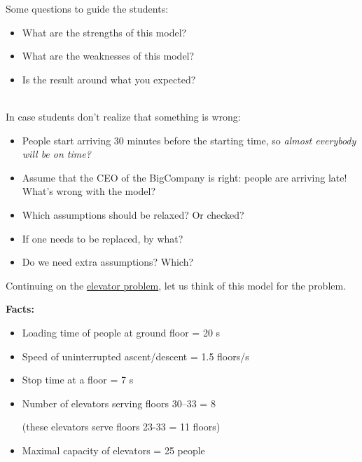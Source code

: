 
\begin{annotation}
\begin{notes}
	Some questions to guide the students:
	\begin{itemize}
		\item What are the strengths of this model?
		\item What are the weaknesses of this model?
		\item Is the result around what you expected?
	\end{itemize}	
	
	\hfill \\
	In case students don't realize that something is wrong:
	\begin{itemize}
		\item People start arriving 30 minutes before the starting time, so \emph{almost everybody will be on time?}
		\item Assume that the CEO of the BigCompany is right: people are arriving late! What's wrong with the model?
	
		\item Which assumptions should be relaxed? Or checked?
		\item If one needs to be replaced, by what?
		\item Do we need extra assumptions? Which?
	\end{itemize}
\end{notes}
\end{annotation}
\question

Continuing on the \hyperref[elevator-model]{elevator problem}, let us think of this model for the problem.

\textbf{Facts:}
\begin{itemize}
	\item Loading time of people at ground floor = 20 s
	\item Speed of uninterrupted ascent/descent = 1.5 floors/s
	\item Stop time at a floor = 7 s
	\item Number of elevators serving floors 30--33 = 8

	(these elevators serve floors 23-33 = 11 floors)
	
	\item Maximal capacity of elevators = 25 people
\end{itemize}



